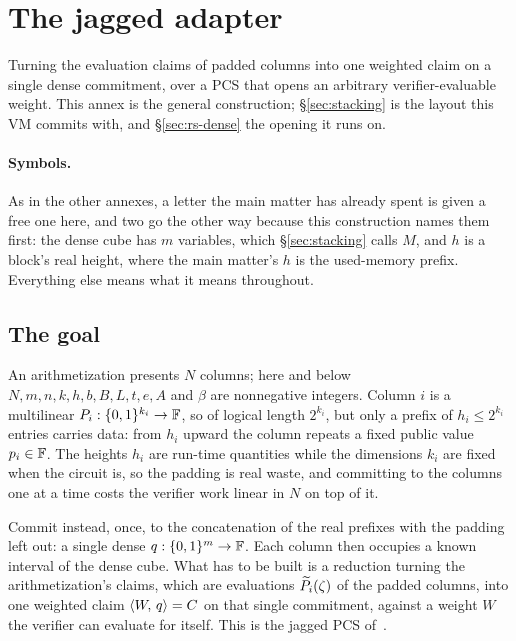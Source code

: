\section{The jagged adapter}\label{annex:jagged}

\begin{center}
\end{center}

Turning the evaluation claims of padded columns into one weighted claim on a single dense commitment, over a PCS that opens an arbitrary verifier-evaluable weight. This annex is the general construction; \S\ref{sec:stacking} is the layout this VM commits with, and \S\ref{sec:rs-dense} the opening it runs on.

\paragraph{Symbols.} As in the other annexes, a letter the main matter has already spent is given a free one here, and two go the other way because this construction names them first: the dense cube has $m$ variables, which \S\ref{sec:stacking} calls $M$, and $h$ is a block's real height, where the main matter's $h$ is the used-memory prefix. Everything else means what it means throughout.

\subsection{The goal}\label{jag:goal}

An arithmetization presents $N$ columns; here and below $N,m,n,k,h,b,B,L,t,e,A$ and $\beta$ are nonnegative integers. Column $i$ is a multilinear $P_i:\{0,1\}^{k_i}\to\mathbb{F}$, so of logical length $2^{k_i}$, but only a prefix of $h_i\le2^{k_i}$ entries carries data: from $h_i$ upward the column repeats a fixed public value $p_i\in\mathbb{F}$. The heights $h_i$ are run-time quantities while the dimensions $k_i$ are fixed when the circuit is, so the padding is real waste, and committing to the columns one at a time costs the verifier work linear in $N$ on top of it.

Commit instead, once, to the concatenation of the real prefixes with the padding left out: a single dense $q:\{0,1\}^{m}\to\mathbb{F}$. Each column then occupies a known interval of the dense cube. What has to be built is a reduction turning the arithmetization's claims, which are evaluations $\widetilde{P_i}(\zeta)$ of the padded columns, into one weighted claim $\langle W,\, q \rangle=C$ on that single commitment, against a weight $W$ the verifier can evaluate for itself. This is the jagged PCS of~\cite{Jagged26}.


